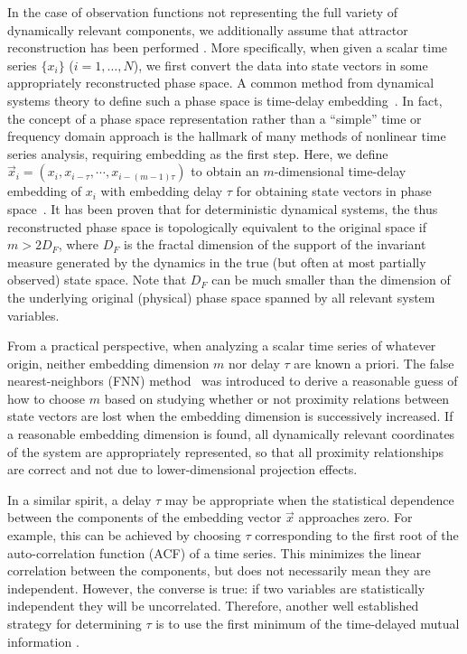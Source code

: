         In the case of observation functions not representing the full variety of dynamically relevant components, we additionally assume that attractor reconstruction has been performed \cite{Fraser1986,kantz1997,Kennel1992,Takens1981}. More specifically, when given a scalar time series $\{x_i\}$ ($i=1,\dots,N$), we first convert the data into state vectors in some appropriately reconstructed phase space. A common method from dynamical systems theory to define such a phase space is time-delay embedding~\cite{Takens1981}. In fact, the concept of a phase space representation rather than a ``simple'' time or frequency domain approach is the hallmark of many methods of nonlinear time series analysis, requiring embedding as the first step. Here, we define $\vec{x}_i = (x_i, x_{i-\tau}, \cdots, x_{i-(m-1)\tau})$ to obtain an $m$-dimensional time-delay embedding of $x_i$ with embedding delay $\tau$ for obtaining state vectors in phase space~\cite{Takens1981}. It has been proven that for deterministic dynamical systems, the thus reconstructed phase space is topologically equivalent to the original space if $m > 2 D_F$, where $D_F$ is the fractal dimension of the support of the invariant measure generated by the dynamics in the true (but often at most partially observed) state space. Note that $D_F$ can be much smaller than the dimension of the underlying original (physical) phase space spanned by all relevant system variables.

		From a practical perspective, when analyzing a scalar time series of whatever origin, neither embedding dimension $m$ nor delay $\tau$ are known a priori. The false nearest-neighbors (FNN) method~\cite{Kennel1992} was introduced to derive a reasonable guess of how to choose $m$ based on studying whether or not proximity relations between state vectors are lost when the embedding dimension is successively increased. If a reasonable embedding dimension is found, all dynamically relevant coordinates of the system are appropriately represented, so that all proximity relationships are correct and not due to lower-dimensional projection effects.

		In a similar spirit, a delay $\tau$ may be appropriate when the statistical dependence between the components of the embedding vector $\vec{x}$ approaches zero. For example, this can be achieved by choosing $\tau$ corresponding to the first root of the auto-correlation function (ACF) of a time series. This minimizes the linear correlation between the components, but does not necessarily mean they are independent. However, the converse is true: if two variables are statistically independent they will be uncorrelated. Therefore, another well established strategy for determining $\tau$ is to use the first minimum of the time-delayed mutual information \cite{Fraser1986}.

